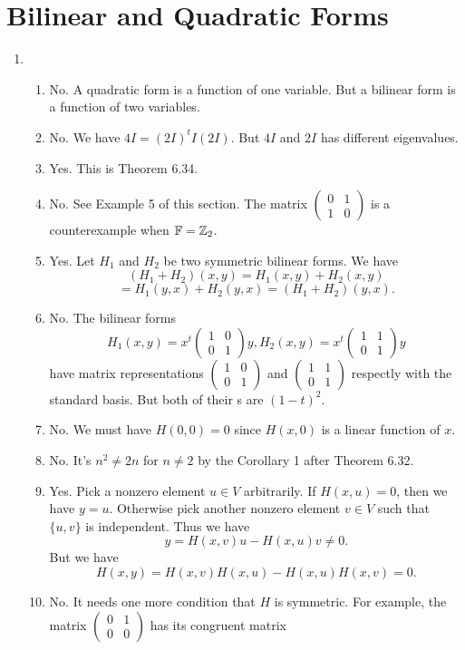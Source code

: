 \section{Bilinear and Quadratic Forms}
\begin{enumerate}
\item \begin{enumerate}
\item No. A quadratic form is a function of one variable. But a bilinear form is a function of two variables.
\item No. We have $4I=(2I)^tI(2I)$. But $4I$ and $2I$ has different eigenvalues.
\item Yes. This is Theorem 6.34.
\item No. See Example 5 of this section. The matrix $\begin{pmatrix}0&1\\1&0\end{pmatrix}$ is a counterexample when $\mathbb{F}=\mathbb{Z}_2$.
\item Yes. Let $H_1$ and $H_2$ be two symmetric bilinear forms. We have 
\[(H_1+H_2)(x,y)=H_1(x,y)+H_2(x,y)\]
\[=H_1(y,x)+H_2(y,x)=(H_1+H_2)(y,x).\]
\item No. The bilinear forms 
\[H_1(x,y)=x^t\begin{pmatrix}1&0\\0&1\end{pmatrix}y, H_2(x,y)=x^t\begin{pmatrix}1&1\\0&1\end{pmatrix}y\]
have matrix representations $\begin{pmatrix}1&0\\0&1\end{pmatrix}$ and $\begin{pmatrix}1&1\\0&1\end{pmatrix}$ respectly with the standard basis. But both of their \charpoly{}s are $(1-t)^2$.
\item No. We must have $H(0,0)=0$ since $H(x,0)$ is a linear function of $x$.
\item No. It's $n^2\neq 2n$ for $n\neq 2$ by the Corollary 1 after Theorem 6.32.
\item Yes. Pick a nonzero element $u\in V$ arbitrarily. If $H(x,u)=0$, then we have $y=u$. Otherwise pick another nonzero element $v\in V$ such that $\{u,v\}$ is independent. Thus we have 
\[y=H(x,v)u-H(x,u)v\neq 0.\]
But we have 
\[H(x,y)=H(x,v)H(x,u)-H(x,u)H(x,v)=0.\]
\item No. It needs one more condition that $H$ is symmetric. For example, the matrix $\begin{pmatrix}0&1\\0&0\end{pmatrix}$ has its congruent matrix 

\end{enumerate}
\end{enumerate}
